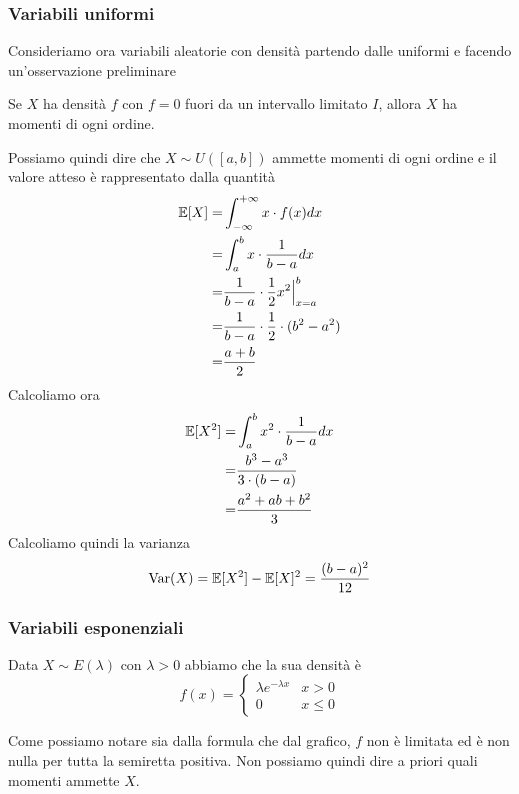 \subsubsection{Variabili uniformi}
Consideriamo ora variabili aleatorie con densità partendo dalle uniformi e facendo un'osservazione
preliminare

\begin{observation}
	Se $X$ ha densità $f$ con $f = 0$ fuori da un intervallo limitato $I$, allora $X$ ha momenti
	di ogni ordine.
\end{observation}

Possiamo quindi dire che $X \sim U([a,b])$ ammette momenti di ogni ordine e il valore atteso è
rappresentato dalla quantità
\begin{align*}
	\mathbb{E}[X] = & \int_{-\infty}^{+\infty} x \cdot f (x) dx           \\
	=       & \int_a^b x \cdot \frac{1}{b-a} dx                   \\
	=       & \frac{1}{b - a} \cdot \frac{1}{2} x^2 \Big|_{x=a}^b \\
	=       & \frac{1}{b - a} \cdot \frac{1}{2} \cdot (b^2 - a^2) \\
	=       & \frac{a + b}{2}
\end{align*}
Calcoliamo ora
\begin{align*}
	\mathbb{E}[X^2] = & \int_a^b x^2 \cdot \frac{1}{b-a} dx \\
	=         & \frac{b^3 - a^3}{3 \cdot (b-a)}     \\
	=         & \frac{a^2 + ab + b^2}{3}
\end{align*}
Calcoliamo quindi la varianza
\[ \operatorname{Var}(X) = \mathbb{E}[X^2] - \mathbb{E}[X]^2 = \frac{(b - a)^2}{12} \]

\subsubsection{Variabili esponenziali}
Data $X \sim E(\lambda)$ con $\lambda > 0$ abbiamo che la sua densità è
\[
	f(x) = \begin{cases}
		\lambda e^{-\lambda x} & x > 0    \\
		0                      & x \leq 0
	\end{cases}
\]
\begin{center}
\end{center}
Come possiamo notare sia dalla formula che dal grafico, $f$ non è limitata ed è non nulla per tutta
la semiretta positiva. Non possiamo quindi dire a priori quali momenti ammette $X$.

